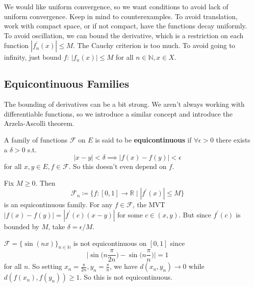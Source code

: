   We would like uniform convergence, so we want conditions to avoid lack of uniform convergence. Keep in mind to counterexamples. To avoid translation, work with compact space, or if not compact, have the functions decay uniformly. To avoid oscillation, we can bound the derivative, which is a restriction on each function $|f_n^\prime (x)| \leq M$. The Cauchy criterion is too much. To avoid going to infinity, just bound $f$: $|f_n (x)| \leq M$ for all $n \in \mathbb{N}, x \in X$. 


\subsection{Equicontinuous Families} 

  The bounding of derivatives can be a bit strong. We aren't always working with differentiable functions, so we introduce a similar concept and introduce the Arzela-Ascolli theorem. 

  \begin{definition}
    A family of functions $\mathcal{F}$ on $E$ is said to be \textbf{equicontinuous} if $\forall \epsilon > 0$ there exists a $\delta > 0$ s.t. 
    \begin{equation}
      |x - y| < \delta \implies |f(x) - f(y)| < \epsilon
    \end{equation}
    for all $x, y \in E, f \in \mathcal{F}$. So this doesn't even depend on $f$. 
  \end{definition}

  \begin{example}
    Fix $M \geq 0$. Then 
    \begin{equation}
      \mathcal{F}_n \coloneqq \{f : [0, 1] \to \mathbb{R} \mid |f^\prime (x)| \leq M \} 
    \end{equation}
    is an equicontinuous family. For any $f \in \mathcal{F}$, the MVT $|f(x) - f(y)| = |f^\prime (c) (x - y)|$ for some $c \in (x, y)$. But since $f^\prime (c)$ is bounded by $M$, take $\delta = \epsilon/M$. 
  \end{example}

  \begin{example}
    $\mathcal{F} = \{\sin(nx)\}_{n \in \mathbb{N}}$ is not equicontinuous on $[0, 1]$ since 
    \begin{equation}
      \bigg| \sin\Big( n \frac{\pi}{2n} \Big) - \sin \Big( n \frac{\pi}{n} \Big) \bigg| = 1
    \end{equation}
    for all $n$. So setting $x_n = \frac{\pi}{2n}, y_n = \frac{\pi}{n}$, we have $d(x_n, y_n) \to 0$ while $d(f(x_n), f(y_n)) \geq 1$. So this is not equicontinuous. 
  \end{example} 

